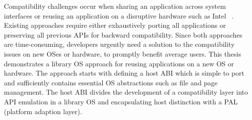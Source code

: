 \placeholder{}


Compatibility challenges occur when sharing an application across system interfaces
or reusing an application on a disruptive hardware
such as Intel \sgx{}~\cite{intelsgx}.
Existing approaches require either
exhaustively porting all applications
or preserving all previous APIs for backward compatibility. %
Since both approaches are time-consuming, developers
urgently need a solution to the compatibility issues
on new OSes or hardware,
to promptly benefit average users.
This thesis demonstrates a library OS approach
for reusing applications
on a new OS or hardware.
The approach
starts with
defining a host ABI
which is simple to port
and sufficiently
contains essential OS abstractions
such as file and page management.
The host ABI divides the development of a compatibility layer
into API emulation in a library OS and encapsulating host distinction with a PAL (platform adaption layer).


 
 






